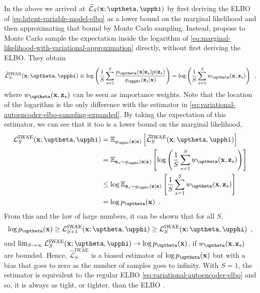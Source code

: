 In the above we arrived at $\widehat{\mathcal{L}}_{S}(\xb;\thetab,\phib)$ by first deriving the ELBO of \cref{eq:latent-variable-model-elbo} as a lower bound on the marginal likelihood and then approximating that bound by Monte Carlo sampling. Instead, \textcite{burda_importance_2016} propose to Monte Carlo sample the expectation inside the logarithm of \cref{eq:marginal-likelihood-with-variational-approximation} directly, without first deriving the ELBO. They obtain
%
\begin{equation}
    \widehat{\mathcal{L}}^{\text{IWAE}}_{S}(\xb;\thetab,\phib) \equiv \log \left( \frac{1}{S}\sum_{s=1}^{S} \frac{p_\thetab(\xb|\zb_{s})p(\zb_{s})}{q_\phib(\zb_{s}|\xb)} \right) =  \log \left( \frac{1}{S}\sum_{s=1}^{S} w_\thetab(\xb,\zb_{s}) \right) \enspace ,
\end{equation}
%
where $w_\thetab(\xb,\zb_{s})$ can be seen as importance weights. Note that the location of the logarithm is the only difference with the estimator in \cref{eq:variational-autoencoder-elbo-sampling-expanded}. 
By taking the expectation of this estimator, we can see that it too is a lower bound on the marginal likelihood,
%
\begin{align}
    \mathcal{L}^{\text{IWAE}}_{S}(\xb;\thetab,\phib)
    &= \mathbb{E}_{q_\phib(\zb|\xb)}\left[ \widehat{\mathcal{L}}^{\text{IWAE}}_{S}(\xb;\thetab,\phib) \right] \nonumber \\
    &= \mathbb{E}_{\zb_{s}\sim q_\phib(\zb|\xb)}\left[ \log \left( \frac{1}{S}\sum_{s=1}^{S} w_\thetab(\xb,\zb_{s}) \right) \right] \nonumber \\
    &\leq \log \mathbb{E}_{\zb_{s}\sim q_\phib(\zb|\xb)}\left[ \frac{1}{S}\sum_{s=1}^{S} w_\thetab(\xb,\zb_{s}) \right] \nonumber \\
    &= \log p_\thetab(\xb) \enspace .
\end{align}
%
From this and the law of large numbers, it can be shown that for all $S$,
%
\begin{equation}
    \log p_\thetab(\xb) \geq \mathcal{L}^{\text{IWAE}}_{S+1}(\xb;\thetab,\phib) \geq \mathcal{L}^{\text{IWAE}}_{S}(\xb;\thetab,\phib) \enspace ,
\end{equation}
%
and $\lim_{S\rightarrow\infty} \mathcal{L}^{\text{IWAE}}_{S}(\xb;\thetab,\phib) \rightarrow \log p_\thetab(\xb)$, if $w_\thetab(\xb,\zb_{s})$ are bounded. 
Hence, $\widehat{\mathcal{L}}^{\text{IWAE}}_{S}$ is a biased estimator of $\log p_\thetab(\xb)$ but with a bias that goes to zero as the number of samples goes to infinity. 
With $S=1$, the estimator is equivalent to the regular ELBO \cref{eq:variational-autoencoder-elbo} and so, it is always as tight, or tighter, than the ELBO \parencite{burda_importance_2016}.


